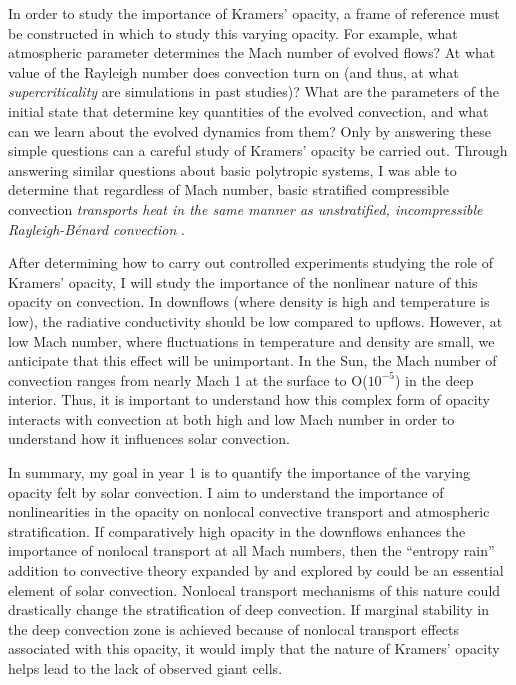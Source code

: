\documentclass[aasms,12pt]{article}
\newcommand{\RB}{Rayleigh-B\'{e}nard }
\begin{document}
In order to study the importance of Kramers' opacity, a frame of reference must be constructed
in which to study this varying opacity. For example, what atmospheric parameter determines the Mach number
of evolved flows?  At what value of the Rayleigh number
does convection turn on (and thus, at what \emph{supercriticality} are simulations in past studies)?
What are the parameters of the initial state that determine key quantities
of the evolved convection, and what can we learn about the evolved dynamics from them?
Only by answering these simple questions can a careful study of Kramers' opacity be carried out.
Through answering similar questions about basic polytropic systems, I was able to determine that
regardless of Mach number, basic stratified compressible convection \emph{transports heat
in the same manner as unstratified, incompressible \RB convection} \citep{anders&brown2017}.

After determining how to carry out controlled experiments studying the role of Kramers' opacity,
I will study the importance of the nonlinear nature of this opacity on convection.
In downflows (where density is high and temperature is low), the radiative conductivity
should be low compared to upflows.
However, at low Mach number, where fluctuations in temperature and density are small,
we anticipate that this effect will be unimportant.  In the Sun,
the Mach number of convection ranges from nearly Mach 1 at the surface to O($10^{-5}$) in the
deep interior.  Thus, it is important to understand how this
complex form of opacity interacts with convection at both high and low Mach number in order to understand
how it influences solar convection.

In summary, my goal in year 1 is to quantify the importance of the varying opacity felt by
solar convection. I aim to understand the importance of
nonlinearities in the opacity on nonlocal convective transport and atmospheric stratification.  If
comparatively high opacity in the downflows enhances the importance of nonlocal transport at
all Mach numbers, then the ``entropy rain'' addition to convective theory expanded by
\cite{brandenburg2016} and explored by \cite{kapyla&all2017} could be an essential element
of solar convection.  Nonlocal transport mechanisms of this nature 
could drastically change the stratification of deep convection. If marginal stability in the deep 
convection zone is achieved because of nonlocal transport effects associated with this opacity,
it would imply that the nature of Kramers' opacity helps lead to the lack of observed giant cells.
\end{document}

